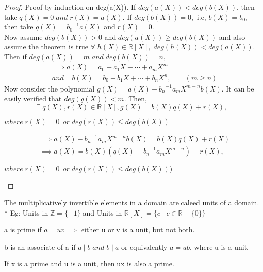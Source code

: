 \documentclass[10pt,a4paper]{article}
\begin{document}
\begin{proof}
Proof by induction on deg(a(X)). If $deg(a(X))<deg(b(X))$, then take $q(X) = 0 \;and\; r(X) = a(X)$. If $deg(b(X)) = 0,$ i.e, $b(X) = b_{0}$, then take $q(X) = {b_{0}}^{-1}a(X)$ and $r(X) = 0$.\\
Now assume $deg(b(X)) > 0$ and $deg(a(X))\ge deg(b(X))$ and also assume the theorem is true $\forall\; h(X) \in \mathbb{R}[X],\; deg(h(X))<deg(a(X))$. \\
Then if $deg(a(X)) = m \;and\; deg(b(X)) = n$,
\begin{align*}
&\implies a(X) = a_{0} + a_{1}X + \cdots + a_{m}X^{m}\\
& and\;\;\;\; b(X) = b_{0} + b_{1}X + \cdots + b_{n}X^{n},\qquad(m\ge n)
\end{align*}
Now consider the polynomial $g(X) = a(X)-{b_{n}}^{-1}a_{m}X^{m-n}b(X)$. It can be easily verified that $deg(g(X)) < m$. Then,
$$\exists\; q(X),r(X)\in \mathbb{R}[X], g(X) = b(X)q(X)+r(X),$$
\begin{flushright}
$where\; r(X) = 0\,\; or\; deg(r(X)) \le deg(b(X))$
\end{flushright}
\begin{align*}
&\implies a(X)-{b_{n}}^{-1}a_{m}X^{m-n}b(X) = b(X)q(X)+r(X) \\
&\implies a(X) = b(X)(q(X)+{b_{n}}^{-1}a_{m}X^{m-n})+r(X),
\end{align*}
\begin{flushright}
$where\;r(X) = 0\,\; or\; deg(r(X)) \le deg(b(X))) $
\end{flushright}
\end{proof}

\begin{mydef}[Unit]
The multiplicatively invertible elements in a domain are caleed units of a domain.
\\* Eg: Units in $\mathbb{Z} = \{\pm 1\}$ and Units in $\mathbb{R}[X] = \{c\mid c \in \mathbb{R}-\{0\}\}$
\end{mydef}

\begin{mydef}[Prime]
a is prime if $a = uv \implies$ either u or v is a unit, but not both.
\end{mydef}

\begin{mydef}[Associate]
b is an associate of a if $a\mid b \; and \; b\mid a$ or equivalently $a = ub$, where u is a unit.
\end{mydef}

\begin{theorem}
If x is a prime and u is a unit, then ux is also a prime.
\end{theorem}
\end{document}
